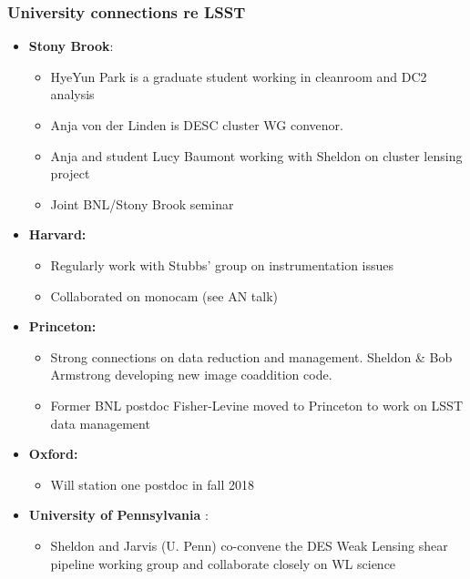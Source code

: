 \documentclass[aspectratio=169]{beamer}
\begin{document}
\begin{frame}
  \frametitle{University connections re LSST}

  \begin{itemize}


    \item \textbf{Stony Brook}:
        \begin{itemize}
            \item HyeYun Park is a graduate student working in cleanroom and
                DC2 analysis
            \item Anja von der Linden is DESC cluster WG convenor.
            \item Anja and student Lucy Baumont working with Sheldon on cluster lensing project
            \item Joint BNL/Stony Brook seminar
        \end{itemize}


    \item \textbf{Harvard:}
        \begin{itemize}
            \item Regularly work with Stubbs' group on instrumentation
                issues
            \item Collaborated on monocam (see AN talk)
        \end{itemize}

    \item \textbf{Princeton:}
        \begin{itemize}
            \item Strong connections on data reduction and management.  Sheldon
                \& Bob Armstrong developing new image coaddition code.
            \item Former BNL postdoc Fisher-Levine moved to Princeton to
                work on LSST data management
        \end{itemize}
    \item \textbf{Oxford:}
        \begin{itemize}
            \item Will station one postdoc in fall 2018
        \end{itemize}

    \item \textbf{University of Pennsylvania }:
        \begin{itemize}
            \item Sheldon and Jarvis (U. Penn) co-convene the DES Weak Lensing 
                shear pipeline working group and collaborate closely on WL science
        \end{itemize}


\end{itemize}
\end{frame}
\end{document}
